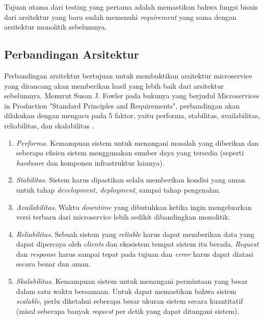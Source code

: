 Tujuan utama dari testing yang pertama adalah memastikan bahwa fungsi bisnis dari arsitektur yang baru sudah memenuhi \textit{requirement} yang sama dengan arsitektur monolitik sebelumnya.
\subsection{Perbandingan Arsitektur}
Perbandingan arsitektur bertujuan untuk membuktikan arsitektur microservice yang dirancang akan memberikan hasil yang lebih baik dari arsitektur sebelumnya. Menurut Susan J. Fowler pada bukunya yang berjudul Microservices in Production "Standard Principles and Requirements", perbandingan akan dilakukan dengan mengacu pada 5 faktor, yaitu performa, stabilitas, availabilitas, reliabilitas, dan skalabilitas \cite{10} .
\begin{enumerate}[leftmargin=*]
	\item \textit{Performa}. Kemampuan sistem untuk menangani masalah yang diberikan dan seberapa efisien sistem menggunakan sumber daya yang tersedia (seperti \textit{hardware} dan komponen infrastruktur lainnya). 
	\item \textit{Stabilitas}. Sistem harus dipastikan selalu memberikan kondisi yang aman untuk tahap \textit{development, deployment}, sampai tahap pengenalan. 
	\item \textit{Availabilitas}. Waktu \textit{downtime} yang dibutuhkan ketika ingin mengeluarkan versi terbaru dari microservice lebih sedikit dibandingkan monolitik.
	\item \textit{Reliabilitas}. Sebuah sistem yang \textit{reliable} harus dapat memberikan data yang dapat dipercaya oleh \textit{clients} dan ekosistem tempat sistem itu berada. \textit{Request} dan \textit{response} harus sampai tepat pada tujuan dan \textit{error} harus dapat diatasi secara benar dan aman.
	\item \textit{Skalabilitas}. Kemampuan sistem untuk menangani permintaan yang besar dalam satu waktu bersamaan. Untuk dapat memastikan bahwa sistem \textit{scalable}, perlu diketahui seberapa besar ukuran sistem secara kuantitatif (misal seberapa banyak \textit{request} per detik yang dapat ditangani sistem).
\end{enumerate}
